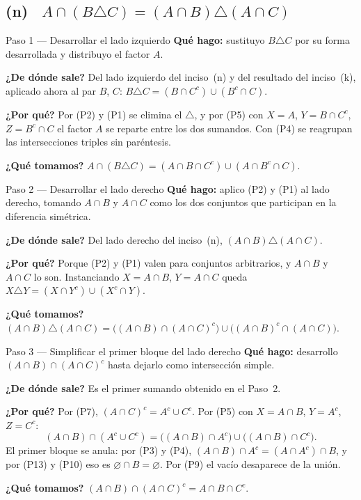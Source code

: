 \documentclass[11pt]{article}
\begin{document}
\subsection*{(n) \ $A\cap(B\triangle C)=(A\cap B)\triangle(A\cap C)$}

\begin{paso}{Paso 1 --- Desarrollar el lado izquierdo}
\textbf{Qué hago:} sustituyo $B\triangle C$ por su forma desarrollada y distribuyo el factor $A$.

\textbf{¿De dónde sale?} Del lado izquierdo del inciso~(n) y del resultado del inciso~(k),
aplicado ahora al par $B$, $C$: $B\triangle C=(B\cap C^{c})\cup(B^{c}\cap C)$.

\textbf{¿Por qué?} Por (P2) y (P1) se elimina el $\triangle$, y por (P5) con $X=A$,
$Y=B\cap C^{c}$, $Z=B^{c}\cap C$ el factor $A$ se reparte entre los dos sumandos. Con (P4) se
reagrupan las intersecciones triples sin paréntesis.

\textbf{¿Qué tomamos?}
$A\cap(B\triangle C)=(A\cap B\cap C^{c})\cup(A\cap B^{c}\cap C)$.
\end{paso}

\begin{paso}{Paso 2 --- Desarrollar el lado derecho}
\textbf{Qué hago:} aplico (P2) y (P1) al lado derecho, tomando $A\cap B$ y $A\cap C$ como los dos
conjuntos que participan en la diferencia simétrica.

\textbf{¿De dónde sale?} Del lado derecho del inciso~(n), $(A\cap B)\triangle(A\cap C)$.

\textbf{¿Por qué?} Porque (P2) y (P1) valen para conjuntos arbitrarios, y $A\cap B$ y $A\cap C$
lo son. Instanciando $X=A\cap B$, $Y=A\cap C$ queda
$X\triangle Y=(X\cap Y^{c})\cup(X^{c}\cap Y)$.

\textbf{¿Qué tomamos?}
$(A\cap B)\triangle(A\cap C)=\bigl((A\cap B)\cap(A\cap C)^{c}\bigr)\cup\bigl((A\cap B)^{c}\cap(A\cap C)\bigr)$.
\end{paso}

\begin{paso}{Paso 3 --- Simplificar el primer bloque del lado derecho}
\textbf{Qué hago:} desarrollo $(A\cap B)\cap(A\cap C)^{c}$ hasta dejarlo como intersección
simple.

\textbf{¿De dónde sale?} Es el primer sumando obtenido en el Paso~2.

\textbf{¿Por qué?} Por (P7), $(A\cap C)^{c}=A^{c}\cup C^{c}$. Por (P5) con $X=A\cap B$,
$Y=A^{c}$, $Z=C^{c}$:
\[
(A\cap B)\cap(A^{c}\cup C^{c})=\bigl((A\cap B)\cap A^{c}\bigr)\cup\bigl((A\cap B)\cap C^{c}\bigr).
\]
El primer bloque se anula: por (P3) y (P4), $(A\cap B)\cap A^{c}=(A\cap A^{c})\cap B$, y por
(P13) y (P10) eso es $\varnothing\cap B=\varnothing$. Por (P9) el vacío desaparece de la unión.

\textbf{¿Qué tomamos?} $(A\cap B)\cap(A\cap C)^{c}=A\cap B\cap C^{c}$.
\end{paso}
\end{document}
